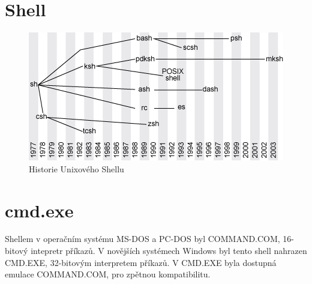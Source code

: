 \documentclass[thesis=M,czech]{FITthesis}[2012/06/26]
\begin{document}




\section{Shell}

\begin{figure}[htb]\centering
	\includegraphics[width=\textwidth]{./images/tmp_shell_history}
	\caption{Historie Unixového Shellu}
	\label{fig:shell_history}
\end{figure}






\section{cmd.exe}

Shellem v operačním systému MS-DOS a PC-DOS byl COMMAND.COM, 16-bitový intepretr příkazů. V novějších systémech Windows byl tento shell nahrazen CMD.EXE, 32-bitovým interpretem příkazů. V CMD.EXE byla dostupná emulace COMMAND.COM, pro zpětnou kompatibilitu. 
\end{document}
